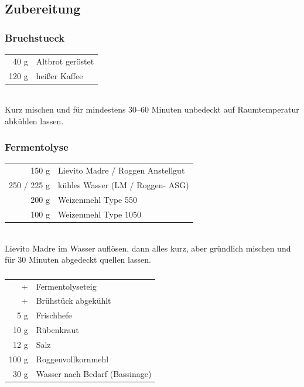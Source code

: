 \subsection*{Zubereitung}

\subsubsection*{\Gls{Bruehstueck}}
\begin{tabular}{r l}
    40 g & Altbrot geröstet\\
    120 g & heißer Kaffee\\
\end{tabular}\\

Kurz mischen und für mindestens 30–60 Minuten unbedeckt auf Raumtemperatur abkühlen lassen.

\subsubsection*{\Gls{Fermentolyse}}
\begin{tabular}{r l}
          150 g & Lievito Madre / Roggen Anstellgut \\
    250 / 225 g & kühles Wasser (LM / Roggen- ASG)  \\
          200 g & Weizenmehl Type 550               \\
          100 g & Weizenmehl Type 1050
\end{tabular}\\

Lievito Madre im Wasser auflösen, dann alles kurz, aber gründlich mischen und für 30 Minuten abgedeckt quellen lassen.


\subsubsection*{}
\begin{tabular}{r l}
        + & Fermentolyseteig                     \\
        + & Brühstück abgekühlt                  \\
      5 g & Frischhefe                           \\
     10 g & Rübenkraut                           \\
     12 g & Salz                                 \\
    100 g & Roggenvollkornmehl                   \\
     30 g & Wasser nach Bedarf (\Gls{Bassinage})
\end{tabular}\\

